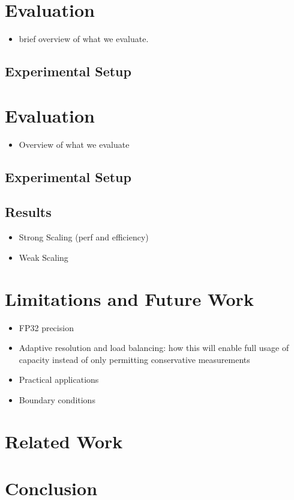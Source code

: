 \documentclass[review, anonymous, acmsmall]{acmart}
\begin{document}
\section{Evaluation}
\begin{itemize}
  \item brief overview of what we evaluate.
\end{itemize}
\subsection{Experimental Setup}
\section{Evaluation}
\begin{itemize}
  \item Overview of what we evaluate
\end{itemize}
\subsection{Experimental Setup}
\subsection{Results}
\begin{itemize}
  \item Strong Scaling (perf and efficiency)
  \item Weak Scaling
\end{itemize}

\section{Limitations and Future Work}
\begin{itemize}
  \item FP32 precision
  \item Adaptive resolution and load balancing: how this will enable full usage of capacity instead of only permitting conservative measurements
  \item Practical applications
  \item Boundary conditions
\end{itemize}

\section{Related Work}

\section{Conclusion}
\end{document}
